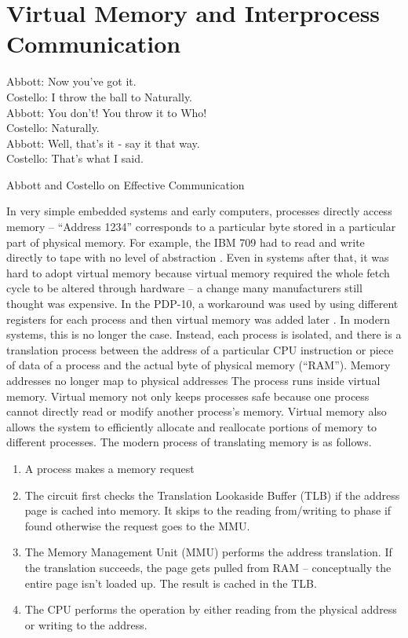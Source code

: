 \chapter{Virtual Memory and Interprocess Communication}

\epigraph{Abbott: Now you've got it. \\
Costello: I throw the ball to Naturally. \\
Abbott: You don't! You throw it to Who! \\
Costello: Naturally. \\
Abbott: Well, that's it - say it that way. \\
Costello: That's what I said.}{Abbott and Costello on Effective Communication}

In very simple embedded systems and early computers, processes directly access memory -- ``Address 1234'' corresponds to a particular byte stored in a particular part of physical memory.
For example, the IBM 709 had to read and write directly to tape with no level of abstraction \cite[P. 65]{ibm709}.
Even in systems after that, it was hard to adopt virtual memory because virtual memory required the whole fetch cycle to be altered through hardware -- a change many manufacturers still thought was expensive.
In the PDP-10, a workaround was used by using different registers for each process and then virtual memory was added later \cite{ricm}.
In modern systems, this is no longer the case.
Instead, each process is isolated, and there is a translation process between the address of a particular CPU instruction or piece of data of a process and the actual byte of physical memory (``RAM'').
Memory addresses no longer map to physical addresses
The process runs inside virtual memory.
Virtual memory not only keeps processes safe because one process cannot directly read or modify another process's memory.
Virtual memory also allows the system to efficiently allocate and reallocate portions of memory to different processes.
The modern process of translating memory is as follows.

\begin{enumerate}
\item A process makes a memory request
\item The circuit first checks the Translation Lookaside Buffer (TLB) if the address page is cached into memory. It skips to the reading from/writing to phase if found otherwise the request goes to the MMU.
\item The Memory Management Unit (MMU) performs the address translation. If the translation succeeds, the page gets pulled from RAM -- conceptually the entire page isn't loaded up. The result is cached in the TLB.
\item The CPU performs the operation by either reading from the physical address or writing to the address.
\end{enumerate}

